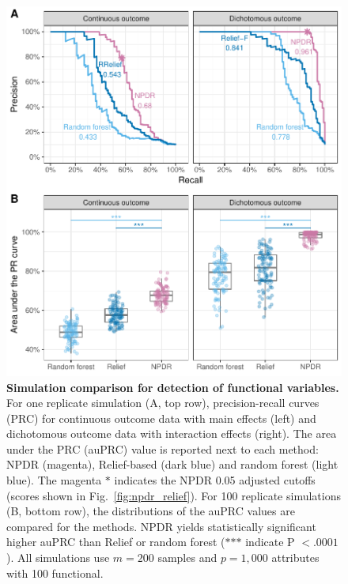 \documentclass{bioinfo}
\begin{document}
\begin{figure}[!tbp]
\centerline{\includegraphics[trim = 0 0 0 0, scale = 0.58]{../../figs/fig2_pr_plots.pdf}}
\caption{{\bf Simulation comparison for detection of functional variables.} For one replicate simulation (A, top row), precision-recall curves (PRC) for continuous outcome data with main effects (left) and dichotomous outcome data with interaction effects (right). The area under the PRC (auPRC) value is reported next to each method: NPDR (magenta), Relief-based (dark blue) and random forest (light blue). The magenta $\ast$ indicates the NPDR 0.05 adjusted cutoffs (scores shown in Fig.~\ref{fig:npdr_relief}). For 100 replicate simulations (B, bottom row), the distributions of the auPRC values are compared for the methods. NPDR yields statistically significant higher auPRC than Relief or random forest ($\ast$$\ast$$\ast$ indicate P $<.0001$). All simulations use $m = 200$ samples and $p = 1,000$ attributes with 100 functional.}
\label{fig:pr_curve}
\end{figure}
\end{document}
